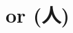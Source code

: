 \chapter{or (人)}

\begin{vocabulary}[doctor]
\end{vocabulary}

\begin{vocabulary}[aggressor]
\end{vocabulary}